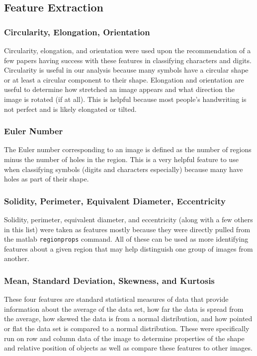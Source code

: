 \subsection{Feature Extraction}
\subsubsection{Circularity, Elongation, Orientation}
Circularity, elongation, and orientation were used upon the recommendation of a few papers having success with these features in classifying characters and digits.  Circularity is useful in our analysis because many symbols have a circular shape or at least a circular component to their shape.  Elongation and orientation are useful to determine how stretched an image appears and what direction the image is rotated (if at all).  This is helpful because most people's handwriting is not perfect and is likely elongated or tilted.
\subsubsection{Euler Number}
The Euler number corresponding to an image is defined as the number of regions minus the number of holes in the region.  This is a very helpful feature to use when classifying symbols (digits and characters especially) because many have holes as part of their shape.
\subsubsection{Solidity, Perimeter, Equivalent Diameter, Eccentricity}
Solidity, perimeter, equivalent diameter, and eccentricity (along with a few others in this list) were taken as features mostly because they were directly pulled from the matlab \texttt{regionprops} command.  All of these can be used as more identifying features about a given region that may help distinguish one group of images from another.
\subsubsection{Mean, Standard Deviation, Skewness, and Kurtosis}
These four features are standard statistical measures of data that provide information about the average of the data set, how far the data is spread from the average, how skewed the data is from a normal distribution, and how pointed or flat the data set is compared to a normal distribution.  These were specifically run on row and column data of the image to determine properties of the shape and relative position of objects as well as compare these features to other images.  
